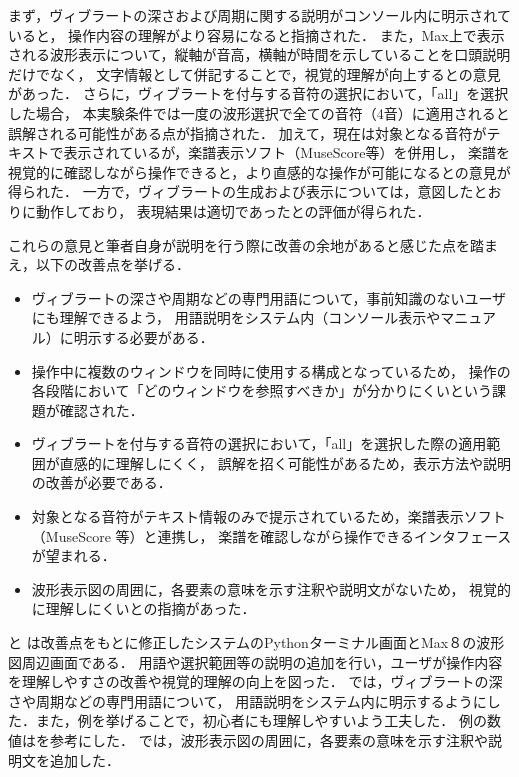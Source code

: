 まず，ヴィブラートの深さおよび周期に関する説明がコンソール内に明示されていると，
操作内容の理解がより容易になると指摘された．
また，Max上で表示される波形表示について，縦軸が音高，横軸が時間を示していることを口頭説明だけでなく，
文字情報として併記することで，視覚的理解が向上するとの意見があった．
さらに，ヴィブラートを付与する音符の選択において，「all」を選択した場合，
本実験条件では一度の波形選択で全ての音符（4音）に適用されると誤解される可能性がある点が指摘された．
加えて，現在は対象となる音符がテキストで表示されているが，楽譜表示ソフト（MuseScore等）を併用し，
楽譜を視覚的に確認しながら操作できると，より直感的な操作が可能になるとの意見が得られた．
一方で，ヴィブラートの生成および表示については，意図したとおりに動作しており，
表現結果は適切であったとの評価が得られた．

これらの意見と筆者自身が説明を行う際に改善の余地があると感じた点を踏まえ，以下の改善点を挙げる．

\begin{itemize}
	\item ヴィブラートの深さや周期などの専門用語について，事前知識のないユーザにも理解できるよう，
	      用語説明をシステム内（コンソール表示やマニュアル）に明示する必要がある．

	\item 操作中に複数のウィンドウを同時に使用する構成となっているため，
	      操作の各段階において「どのウィンドウを参照すべきか」が分かりにくいという課題が確認された．

	\item ヴィブラートを付与する音符の選択において，「all」を選択した際の適用範囲が直感的に理解しにくく，
	      誤解を招く可能性があるため，表示方法や説明の改善が必要である．

	\item 対象となる音符がテキスト情報のみで提示されているため，楽譜表示ソフト（MuseScore 等）と連携し，
	      楽譜を確認しながら操作できるインタフェースが望まれる．

	\item 波形表示図の周囲に，各要素の意味を示す注釈や説明文がないため，
	      視覚的に理解しにくいとの指摘があった．
\end{itemize}

 と
は改善点をもとに修正したシステムのPythonターミナル画面とMax８の波形図周辺画面である．
用語や選択範囲等の説明の追加を行い，ユーザが操作内容を理解しやすさの改善や視覚的理解の向上を図った．
では，ヴィブラートの深さや周期などの専門用語について，
用語説明をシステム内に明示するようにした．また，例を挙げることで，初心者にも理解しやすいよう工夫した．
例の数値は\cite{Sundberg87,Seashore38}を参考にした．
では，波形表示図の周囲に，各要素の意味を示す注釈や説明文を追加した．


